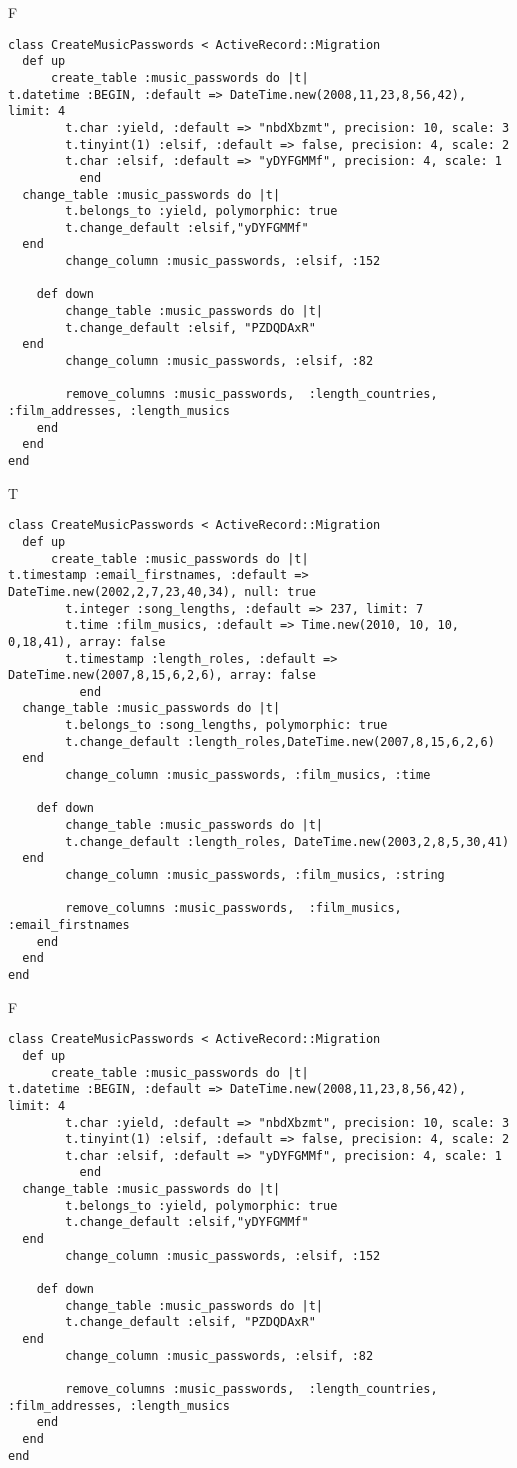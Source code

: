 F
\begin{verbatim}
class CreateMusicPasswords < ActiveRecord::Migration
  def up
	  create_table :music_passwords do |t|
t.datetime :BEGIN, :default => DateTime.new(2008,11,23,8,56,42), limit: 4
		t.char :yield, :default => "nbdXbzmt", precision: 10, scale: 3
		t.tinyint(1) :elsif, :default => false, precision: 4, scale: 2
		t.char :elsif, :default => "yDYFGMMf", precision: 4, scale: 1
		  end
  change_table :music_passwords do |t|
		t.belongs_to :yield, polymorphic: true
 		t.change_default :elsif,"yDYFGMMf"
  end
 		change_column :music_passwords, :elsif, :152
   
	def down
		change_table :music_passwords do |t|
		t.change_default :elsif, "PZDQDAxR"
  end
 		change_column :music_passwords, :elsif, :82
   
		remove_columns :music_passwords,  :length_countries, :film_addresses, :length_musics 
    end 
  end
end

\end{verbatim}

T
\begin{verbatim}
class CreateMusicPasswords < ActiveRecord::Migration
  def up
	  create_table :music_passwords do |t|
t.timestamp :email_firstnames, :default => DateTime.new(2002,2,7,23,40,34), null: true
		t.integer :song_lengths, :default => 237, limit: 7
		t.time :film_musics, :default => Time.new(2010, 10, 10, 0,18,41), array: false
		t.timestamp :length_roles, :default => DateTime.new(2007,8,15,6,2,6), array: false
		  end
  change_table :music_passwords do |t|
		t.belongs_to :song_lengths, polymorphic: true
 		t.change_default :length_roles,DateTime.new(2007,8,15,6,2,6)
  end
 		change_column :music_passwords, :film_musics, :time
   
	def down
		change_table :music_passwords do |t|
		t.change_default :length_roles, DateTime.new(2003,2,8,5,30,41)
  end
 		change_column :music_passwords, :film_musics, :string
   
		remove_columns :music_passwords,  :film_musics, :email_firstnames 
    end 
  end
end

\end{verbatim}

F
\begin{verbatim}
class CreateMusicPasswords < ActiveRecord::Migration
  def up
	  create_table :music_passwords do |t|
t.datetime :BEGIN, :default => DateTime.new(2008,11,23,8,56,42), limit: 4
		t.char :yield, :default => "nbdXbzmt", precision: 10, scale: 3
		t.tinyint(1) :elsif, :default => false, precision: 4, scale: 2
		t.char :elsif, :default => "yDYFGMMf", precision: 4, scale: 1
		  end
  change_table :music_passwords do |t|
		t.belongs_to :yield, polymorphic: true
 		t.change_default :elsif,"yDYFGMMf"
  end
 		change_column :music_passwords, :elsif, :152
   
	def down
		change_table :music_passwords do |t|
		t.change_default :elsif, "PZDQDAxR"
  end
 		change_column :music_passwords, :elsif, :82
   
		remove_columns :music_passwords,  :length_countries, :film_addresses, :length_musics 
    end 
  end
end

\end{verbatim}

